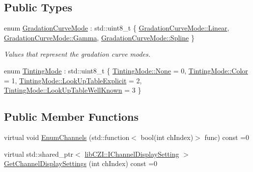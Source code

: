 \subsection*{Public Types}
\begin{DoxyCompactItemize}
\item 
enum \hyperlink{classlib_c_z_i_1_1_i_display_settings_af114dfcc8a603ca1c2fc57bc35c97684}{Gradation\+Curve\+Mode} \+: std\+::uint8\+\_\+t \{ \hyperlink{classlib_c_z_i_1_1_i_display_settings_af114dfcc8a603ca1c2fc57bc35c97684a32a843da6ea40ab3b17a3421ccdf671b}{Gradation\+Curve\+Mode\+::\+Linear}, 
\hyperlink{classlib_c_z_i_1_1_i_display_settings_af114dfcc8a603ca1c2fc57bc35c97684ad9cdb0f6e0d556347c10a8695545a4b5}{Gradation\+Curve\+Mode\+::\+Gamma}, 
\hyperlink{classlib_c_z_i_1_1_i_display_settings_af114dfcc8a603ca1c2fc57bc35c97684a4cff6afc4963881749f7742fbb4d1392}{Gradation\+Curve\+Mode\+::\+Spline}
 \}\begin{DoxyCompactList}\small\item\em Values that represent the gradation curve modes. \end{DoxyCompactList}
\item 
enum \hyperlink{classlib_c_z_i_1_1_i_display_settings_a5a69bda933a814a09f15983606047876}{Tinting\+Mode} \+: std\+::uint8\+\_\+t \{ \hyperlink{classlib_c_z_i_1_1_i_display_settings_a5a69bda933a814a09f15983606047876a6adf97f83acf6453d4a6a4b1070f3754}{Tinting\+Mode\+::\+None} = 0, 
\hyperlink{classlib_c_z_i_1_1_i_display_settings_a5a69bda933a814a09f15983606047876acb5feb1b7314637725a2e73bdc9f7295}{Tinting\+Mode\+::\+Color} = 1, 
\hyperlink{classlib_c_z_i_1_1_i_display_settings_a5a69bda933a814a09f15983606047876a61f8182e36d4c95e5189d83abe8ef4db}{Tinting\+Mode\+::\+Look\+Up\+Table\+Explicit} = 2, 
\hyperlink{classlib_c_z_i_1_1_i_display_settings_a5a69bda933a814a09f15983606047876a39e07c28126f2fe17c07b25db1adfa2d}{Tinting\+Mode\+::\+Look\+Up\+Table\+Well\+Known} = 3
 \}
\end{DoxyCompactItemize}
\subsection*{Public Member Functions}
\begin{DoxyCompactItemize}
\item 
virtual void \hyperlink{classlib_c_z_i_1_1_i_display_settings_af19480abbb7905656e5411bd34d0506d}{Enum\+Channels} (std\+::function$<$ bool(int ch\+Index)$>$ func) const =0
\item 
virtual std\+::shared\+\_\+ptr$<$ \hyperlink{classlib_c_z_i_1_1_i_channel_display_setting}{lib\+C\+Z\+I\+::\+I\+Channel\+Display\+Setting} $>$ \hyperlink{classlib_c_z_i_1_1_i_display_settings_ad67ab35e429286d38dd11245eda3dc4c}{Get\+Channel\+Display\+Settings} (int ch\+Index) const =0
\end{DoxyCompactItemize}
